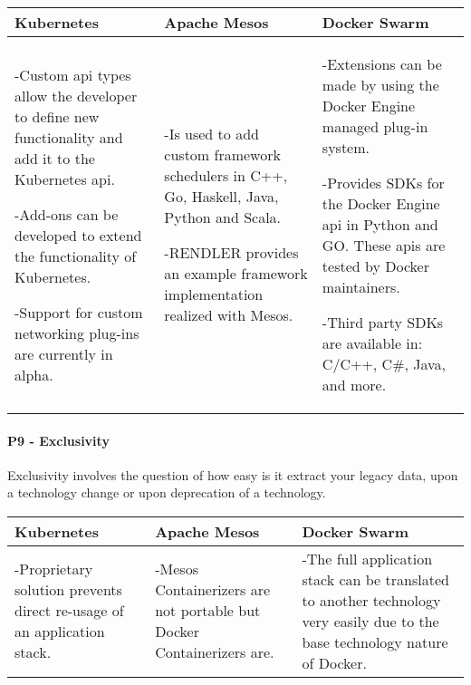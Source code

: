 \begin{center}
  \begin{tabular}{ | p{4.5cm} | p{4.5cm} | p{4.5cm} | }
    \hline
    \textbf{Kubernetes}&\textbf{Apache Mesos}&\textbf{Docker Swarm}\\\hline
    -Custom \gls{api} types allow the developer to define new functionality and add it
    to the Kubernetes \gls{api}.
    
    -Add-ons can be developed to extend the functionality of Kubernetes.
    
    -Support for custom networking plug-ins are currently in alpha.& 
    
    -Is used to add custom framework schedulers in C++, Go, Haskell, Java,
    Python and Scala.
    
    -RENDLER provides an example framework implementation realized with Mesos.& 
    
    -Extensions can be made by using the Docker Engine managed plug-in system.
    
    -Provides SDKs for the Docker Engine \gls{api} in Python and GO. These
    \glspl{api} are tested by Docker maintainers.
    
    -Third party SDKs are available in: C/C++, C\#, Java, and more.\\
    \hline
  \end{tabular}
\end{center}

\newpage
\paragraph{P9 - Exclusivity}

Exclusivity involves the question of how easy is it extract your legacy data,
upon a technology change or upon deprecation of a technology.

\begin{center}
  \begin{tabular}{ | p{4.5cm} | p{4.5cm} | p{4.5cm} | }
    \hline
    \textbf{Kubernetes}&\textbf{Apache Mesos}&\textbf{Docker Swarm}\\\hline
    -Proprietary solution prevents direct re-usage of an application stack. & 
    
    -Mesos Containerizers are not portable but Docker Containerizers are. &
    
    -The full application stack can be translated to another technology very
    easily due to the base technology nature of Docker.\\
    \hline
  \end{tabular}
\end{center}

